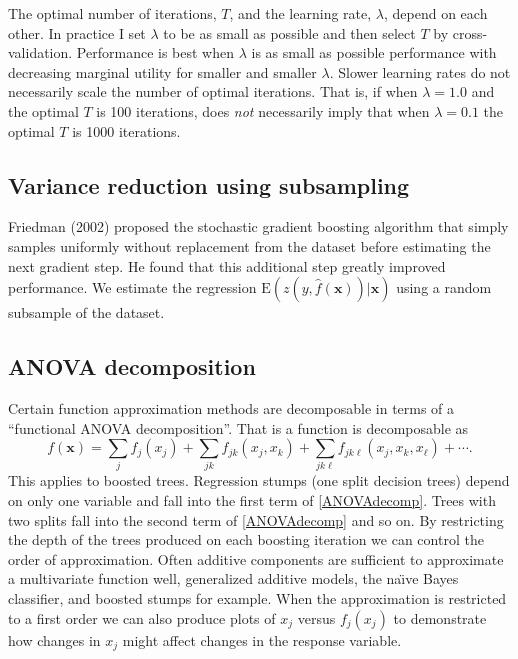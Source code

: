 \documentclass{article}
\newcommand{\EV}{\mathrm{E}}
\begin{document}
The optimal number of iterations, $T$, and the learning rate, $\lambda$, depend on each other. In practice I set $\lambda$ to be as small as possible and then select $T$ by cross-validation. Performance is best when $\lambda$ is as small as possible performance with decreasing marginal utility for smaller and smaller $\lambda$. Slower learning rates do not necessarily scale the number of optimal iterations. That is, if when $\lambda=1.0$ and the optimal $T$ is 100 iterations, does {\it not} necessarily imply that when $\lambda=0.1$ the optimal $T$ is 1000 iterations.

\subsection{Variance reduction using subsampling}

Friedman (2002) proposed the stochastic gradient boosting algorithm that simply samples uniformly without replacement from the dataset before estimating the next gradient step. He found that this additional step greatly improved performance. We estimate the regression $\EV(z(y,\hat f(\mathbf{x}))|\mathbf{x})$ using a random subsample of the dataset.

\subsection{ANOVA decomposition}

Certain function approximation methods are decomposable in terms of a ``functional ANOVA decomposition''. That is a function is decomposable as
\begin{equation} 
\label{ANOVAdecomp} 
f(\mathbf{x}) = \sum_j f_j(x_j) + \sum_{jk} f_{jk}(x_j,x_k) + \sum_{jk\ell} f_{jk\ell}(x_j,x_k,x_\ell) + \cdots. 
\end{equation} This applies to boosted trees. Regression stumps (one split decision trees) depend on only one variable and fall into the first term of \ref{ANOVAdecomp}. Trees with two splits fall into the second term of \ref{ANOVAdecomp} and so on. By restricting the depth of the trees produced on each boosting iteration we can control the order of approximation. Often additive components are sufficient to approximate a multivariate function well, generalized additive models, the na\"{\i}ve Bayes classifier, and boosted stumps for example. When the approximation is restricted to a first order we can also produce plots of $x_j$ versus $f_j(x_j)$ to demonstrate how changes in $x_j$ might affect changes in the response variable.
\end{document}
